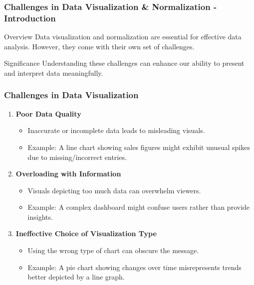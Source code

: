 \documentclass[aspectratio=169]{beamer}
\begin{document}
\begin{frame}[fragile]
    \frametitle{Challenges in Data Visualization \& Normalization - Introduction}
    \begin{block}{Overview}
        Data visualization and normalization are essential for effective data analysis. However, they come with their own set of challenges.
    \end{block}
    \begin{block}{Significance}
        Understanding these challenges can enhance our ability to present and interpret data meaningfully.
    \end{block}
\end{frame}

\begin{frame}[fragile]
    \frametitle{Challenges in Data Visualization}
    \begin{enumerate}
        \item \textbf{Poor Data Quality}
            \begin{itemize}
                \item Inaccurate or incomplete data leads to misleading visuals.
                \item Example: A line chart showing sales figures might exhibit unusual spikes due to missing/incorrect entries.
            \end{itemize}

        \item \textbf{Overloading with Information}
            \begin{itemize}
                \item Visuals depicting too much data can overwhelm viewers.
                \item Example: A complex dashboard might confuse users rather than provide insights.
            \end{itemize}
        
        \item \textbf{Ineffective Choice of Visualization Type}
            \begin{itemize}
                \item Using the wrong type of chart can obscure the message.
                \item Example: A pie chart showing changes over time misrepresents trends better depicted by a line graph.
            \end{itemize}
    \end{enumerate}
\end{frame}
\end{document}
